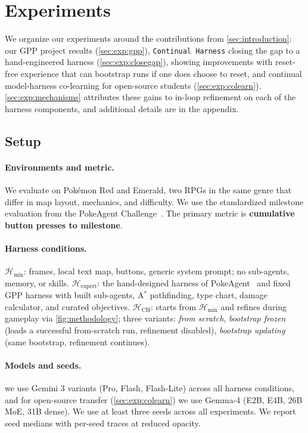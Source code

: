 \section{Experiments}\label{sec:experiments}

We organize our experiments around the contributions from \cref{sec:introduction}: our GPP project results (\cref{sec:exp:gpp}), \texttt{Continual Harness} closing the gap to a hand-engineered harness (\cref{sec:exp:closegap}), showing improvements with reset-free experience that can bootstrap runs if one does choose to reset, and continual model-harness co-learning for open-source students (\cref{sec:exp:colearn}). 
\cref{sec:exp:mechanisms} attributes these gains to in-loop refinement on each of the harness components, and additional details are in the appendix.

\subsection{Setup}\label{sec:exp:setup}

\paragraph{Environments and metric.} We evaluate on Pok\'emon Red and Emerald, two RPGs in the same genre that differ in map layout, mechanics, and difficulty. We use the standardized milestone evaluation from the PokeAgent Challenge~\citep{karten2026pokeagent}. The primary metric is \textbf{cumulative button presses to milestone}.

\paragraph{Harness conditions.} $\mathcal{H}_{\min}$: frames, local text map, buttons, generic system prompt; no sub-agents, memory, or skills. $\mathcal{H}_\mathrm{expert}$: the hand-designed harness of PokeAgent~\citep{karten2026pokeagent} and fixed GPP harness with built sub-agents, A$^*$ pathfinding, type chart, damage calculator, and curated objectives. $\mathcal{H}_\mathrm{CH}$: starts from $\mathcal{H}_{\min}$ and refines during gameplay via \cref{fig:methodology}; three variants: \emph{from scratch}, \emph{bootstrap frozen} (loads a successful from-scratch run, refinement disabled), \emph{bootstrap updating} (same bootstrap, refinement continues).

\paragraph{Models and seeds.} we use Gemini 3 variants (Pro, Flash, Flash-Lite) across all harness conditions, and for open-source transfer (\cref{sec:exp:colearn}) we use Gemma-4 (E2B, E4B, 26B MoE, 31B dense). We use at least three seeds across all experiments. We report seed medians with per-seed traces at reduced opacity.

